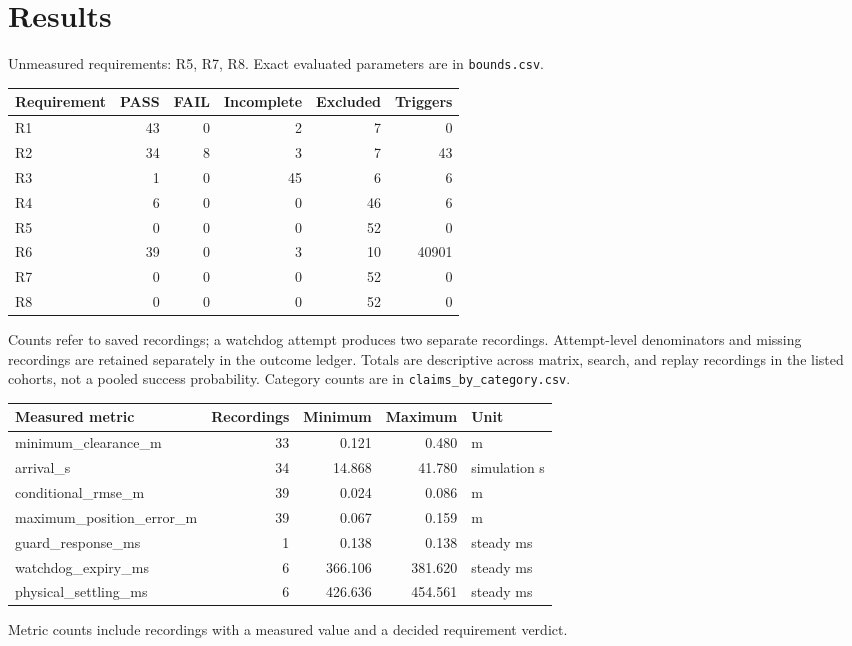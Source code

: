 \documentclass[10pt]{article}
\begin{document}
\section{Results}
Unmeasured requirements: R5, R7, R8. Exact evaluated parameters are in \texttt{bounds.csv}.
\begin{center}\begin{tabular}{lrrrrr}\toprule
Requirement & PASS & FAIL & Incomplete & Excluded & Triggers\\\midrule
R1 & 43 & 0 & 2 & 7 & 0 \\
R2 & 34 & 8 & 3 & 7 & 43 \\
R3 & 1 & 0 & 45 & 6 & 6 \\
R4 & 6 & 0 & 0 & 46 & 6 \\
R5 & 0 & 0 & 0 & 52 & 0 \\
R6 & 39 & 0 & 3 & 10 & 40901 \\
R7 & 0 & 0 & 0 & 52 & 0 \\
R8 & 0 & 0 & 0 & 52 & 0 \\
\bottomrule\end{tabular}\end{center}
Counts refer to saved recordings; a watchdog attempt produces two separate recordings.
Attempt-level denominators and missing recordings are retained separately in the outcome ledger.
Totals are descriptive across matrix, search, and replay recordings in the listed cohorts,
not a pooled success probability. Category counts are in \texttt{claims\_by\_category.csv}.
\begin{center}\small\begin{tabular}{lrrrl}\toprule
Measured metric & Recordings & Minimum & Maximum & Unit\\\midrule
minimum\_clearance\_m & 33 & 0.121 & 0.480 & m \\
arrival\_s & 34 & 14.868 & 41.780 & simulation s \\
conditional\_rmse\_m & 39 & 0.024 & 0.086 & m \\
maximum\_position\_error\_m & 39 & 0.067 & 0.159 & m \\
guard\_response\_ms & 1 & 0.138 & 0.138 & steady ms \\
watchdog\_expiry\_ms & 6 & 366.106 & 381.620 & steady ms \\
physical\_settling\_ms & 6 & 426.636 & 454.561 & steady ms \\
\bottomrule\end{tabular}\end{center}
Metric counts include recordings with a measured value and a decided requirement verdict.
\end{document}
